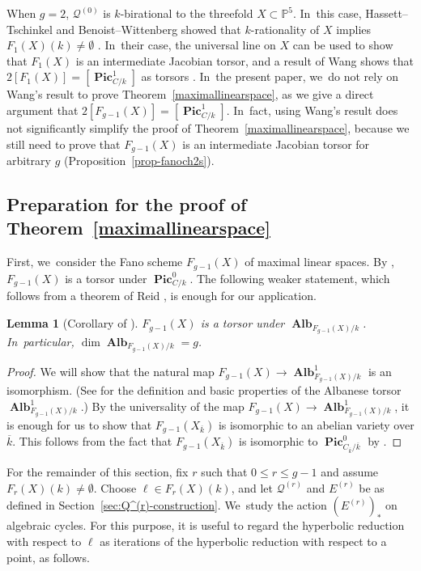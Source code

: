 \documentclass[JEP,XML,SOM,Unicode,NoEqCountersInSection,published]{cedram}
\let\cal\mathcal
\let\bb\mathbb\let\Bbb\mathbb
\theoremstyle{plain}
\newtheorem{lem}[thm]{Lemma}
\theoremstyle{definition}
\DeclareMathOperator{\bAlb}{\mathbf{Alb}}
\DeclareMathOperator{\bPic}{\mathbf{Pic}}
\newcommand{\kbar}{{\overline{k}}}
\begin{document}
When \(g=2\), \(\cal Q^{(0)}\) is \(k\)-birational to the threefold \(X \subset \bb P^5\). In~this case, Hassett--Tschinkel and Benoist--Wittenberg showed that \(k\)-rationality of \(X\) implies \hbox{\(F_1(X)(k)\!\neq\!\emptyset\)} \cite{HT-intersection-quadrics,BW-IJ}. In~their case, the universal line on \(X\) can be used to show that \(F_1(X)\) is an intermediate Jacobian torsor, and a result of Wang shows that \(2[F_1(X)]=[\bPic^1_{C/k}]\) as torsors \cite{Wang-maximal-linear-spaces}. In~the present paper, we~do not rely on Wang's result to prove Theorem~\ref{maximallinearspace}, as we give a direct argument that \(2[F_{g-1}(X)]=[\bPic^1_{C/k}]\). In~fact, using Wang's result does not significantly simplify the proof of Theorem~\ref{maximallinearspace}, because we still need to prove that \(F_{g-1}(X)\) is an intermediate Jacobian torsor for arbitrary \(g\) (Proposition~\ref{prop-fanoch2s}).

\subsection{Preparation for the proof of Theorem~\ref{maximallinearspace}}
First, we~consider the Fano scheme \(F_{g-1}(X)\) of maximal linear spaces.
By \cite[Th.\,1.1]{Wang-maximal-linear-spaces},
$F_{g-1}(X)$ is a torsor under $\bPic^0_{C/k}$.
The following weaker statement, which follows from a theorem of Reid \cite[Th.\,4.8]{Reid-thesis}, is enough for our application.

\begin{lem}[Corollary of {\cite[Th.\,4.8]{Reid-thesis}}]\label{lem:fanotorsor}
$F_{g-1}(X)$ is a torsor under $\bAlb_{F_{g-1}(X)/k}$. In~particular, $\dim \bAlb_{F_{g-1}(X)/k}=g$.
\end{lem}

\begin{proof}
We will show that the natural map $F_{g-1}(X)\to \bAlb^1_{F_{g-1}(X)/k}$ is an isomorphism.
(See \cite[\S 2]{wittenberg08} for the definition and basic properties of the Albanese torsor $\bAlb^1_{F_{g-1}(X)/k}$.)
By the universality of the map $F_{g-1}(X)\to \bAlb^1_{F_{g-1}(X)/k}$, it is enough for us to show that $F_{g-1}(X_{\kbar})$ is isomorphic to an abelian variety over $\kbar$.
This follows from the fact that $F_{g-1}(X_{\kbar})$ is isomorphic to $\bPic_{C_{\kbar}/\kbar}^0$ by \cite[Th.\,4.8]{Reid-thesis}.
\end{proof}

For the remainder of this section, fix $r$ such that \(0\leq r \leq g-1\) and assume $F_r(X)(k)\neq \emptyset$. Choose $\ell\in F_r(X)(k)$, and let $\mathcal{Q}^{(r)}$ and \(E^{(r)}\) be as defined in Section~\ref{sec:Q^(r)-construction}. We~study the action $(E^{(r)})_*$ on algebraic cycles.
For this purpose, it is useful to
regard the hyperbolic reduction with respect to $\ell$ as iterations of the hyperbolic reduction with respect to a point, as follows.
\end{document}
